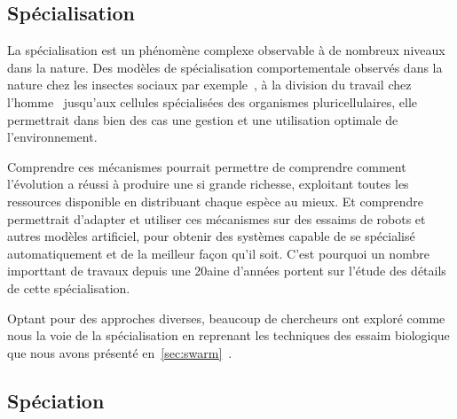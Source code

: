 \documentclass[a4paper,10pt]{report}
\begin{document}
\subsection{Spécialisation}
\label{sec:concept:special}

La spécialisation est un phénomène complexe observable à de nombreux niveaux dans la nature. Des modèles de spécialisation comportementale observés dans la nature chez les insectes sociaux par exemple~\citep{bonabeau96quantitativestudyfixedthresholdmodelregulationdivisionlabourinsectsocieties}, à la division du travail chez l'homme~\citep{smith1776wealthofnation} jusqu'aux cellules spécialisées des organismes pluricellulaires, elle permettrait dans bien des cas une gestion et une utilisation optimale de l'environnement.

Comprendre ces mécanismes pourrait permettre de comprendre comment l'évolution a réussi à produire une si grande richesse, exploitant toutes les ressources disponible en distribuant chaque espèce au mieux. Et comprendre permettrait d'adapter et utiliser ces mécanismes sur des essaims de robots et autres modèles artificiel, pour obtenir des systèmes capable de se spécialisé automatiquement et de la meilleur façon qu'il soit. C'est pourquoi un nombre importtant de travaux depuis une 20aine d'années portent sur l'étude des détails de cette spécialisation.

Optant pour des approches diverses, beaucoup de chercheurs ont exploré comme nous la voie de la spécialisation en reprenant les techniques des essaim biologique que nous avons présenté en~\ref{sec:swarm}~\citep[pour une revue complète de ces études utilisant l'approche \emph{swarm intelligence} et des questions qu'elles soulèvent voir:][]{nitschke08emergentspecializationbiologicallyinspiredcollectivebehaviorsystems}.




\subsection{Spéciation}
\label{sec:concept:speciat}
\end{document}
